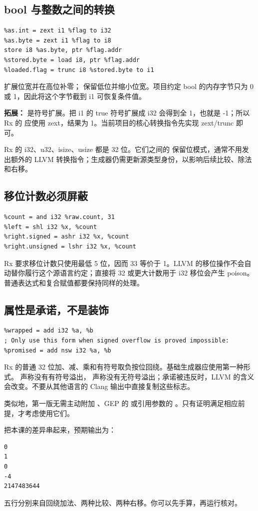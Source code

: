 \subsection{bool 与整数之间的转换}
\begin{lstlisting}
%as.int = zext i1 %flag to i32
%as.byte = zext i1 %flag to i8
store i8 %as.byte, ptr %flag.addr
%stored.byte = load i8, ptr %flag.addr
%loaded.flag = trunc i8 %stored.byte to i1
\end{lstlisting}
 扩展位宽并在高位补零； 保留低位并缩小位宽。项目约定 bool 的内存字节只为 0 或 1，因此将这个字节截到 i1 可恢复条件值。

\textbf{拓展：} 是符号扩展。把 i1 的 true 符号扩展成 i32 会得到全 1，也就是 -1；所以 Rx 的  应使用 zext，结果为 1。当前项目的核心转换指令先实现 zext/trunc 即可。

Rx 的 i32、u32、isize、usize 都是 32 位。它们之间的  保留位模式，通常不用发出额外的 LLVM 转换指令；生成器仍需更新源类型身份，以影响后续比较、除法和右移。

\subsection{移位计数必须屏蔽}
\begin{lstlisting}
%count = and i32 %raw.count, 31
%left = shl i32 %x, %count
%right.signed = ashr i32 %x, %count
%right.unsigned = lshr i32 %x, %count
\end{lstlisting}
Rx 要求移位计数只使用最低 5 位，因而 33 等价于 1。LLVM 的移位操作不会自动替你履行这个源语言约定；直接将 32 或更大计数用于 i32 移位会产生 poison。普通表达式和复合赋值都要保持同样的处理。

\subsection{属性是承诺，不是装饰}
\begin{lstlisting}
%wrapped = add i32 %a, %b
; Only use this form when signed overflow is proved impossible:
%promised = add nsw i32 %a, %b
\end{lstlisting}
Rx 的普通 32 位加、减、乘和有符号取负按位回绕。基础生成器应使用第一种形式。 声称没有有符号溢出， 声称没有无符号溢出；承诺被违反时，LLVM 的含义会改变。不要从其他语言的 Clang 输出中直接复制这些标志。

类似地，第一版无需主动附加 、GEP 的  或引用参数的 。只有证明满足相应前提，才考虑使用它们。


 把本课的差异串起来，预期输出为：
\begin{lstlisting}[language={},numbers=none]
0
1
0
-4
2147483644
\end{lstlisting}
五行分别来自回绕加法、两种比较、两种右移。你可以先手算，再运行核对。
